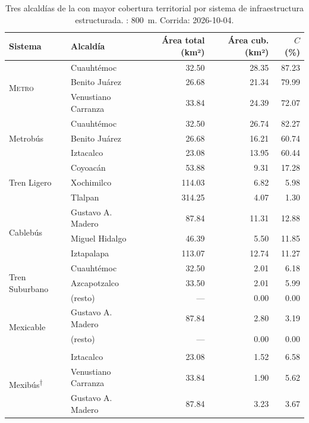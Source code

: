 \begin{table}[H]
    \centering
    \caption[Cobertura territorial — sistemas estructurados, top 3 por alcaldía]{
    Tres alcaldías de la \cdmx{} con mayor cobertura territorial por sistema de
    infraestructura estructurada. : 800~m. Corrida: 2026-10-04.}
    \label{tab:cobertura-estructurados}
    \fontsize{8.5pt}{10.5pt}\selectfont
    \begin{tabularx}{\textwidth}{|l|X|r|r|r|}
        \hline
        \textbf{Sistema} & \textbf{Alcaldía} &
        \textbf{Área total (km²)} & \textbf{Área cub. (km²)} &
        \textbf{$C$ (\%)} \\
        \hline
        \multirow{3}{*}{\textsc{Metro}}
            & Cuauhtémoc          & 32.50 & 28.35 & 87.23 \\
            & Benito Juárez       & 26.68 & 21.34 & 79.99 \\
            & Venustiano Carranza & 33.84 & 24.39 & 72.07 \\
        \hline
        \multirow{3}{*}{Metrobús}
            & Cuauhtémoc    & 32.50 & 26.74 & 82.27 \\
            & Benito Juárez & 26.68 & 16.21 & 60.74 \\
            & Iztacalco     & 23.08 & 13.95 & 60.44 \\
        \hline
        \multirow{3}{*}{Tren Ligero}
            & Coyoacán   &  53.88 &  9.31 & 17.28 \\
            & Xochimilco & 114.03 &  6.82 &  5.98 \\
            & Tlalpan    & 314.25 &  4.07 &  1.30 \\
        \hline
        \multirow{3}{*}{Cablebús}
            & Gustavo A. Madero &  87.84 & 11.31 & 12.88 \\
            & Miguel Hidalgo    &  46.39 &  5.50 & 11.85 \\
            & Iztapalapa        & 113.07 & 12.74 & 11.27 \\
        \hline
        \multirow{3}{*}{Tren Suburbano}
            & Cuauhtémoc   & 32.50 & 2.01 & 6.18 \\
            & Azcapotzalco & 33.50 & 2.01 & 5.99 \\
            & (resto)      &  ---  & 0.00 & 0.00 \\
        \hline
        \multirow{3}{*}{Mexicable}
            & Gustavo A. Madero &  87.84 & 2.80 & 3.19 \\
            & (resto)           &   ---  & 0.00 & 0.00 \\
            &                   &        &      &      \\
        \hline
        \multirow{3}{*}{Mexibús\textsuperscript{†}}
            & Iztacalco           & 23.08 & 1.52 & 6.58 \\
            & Venustiano Carranza & 33.84 & 1.90 & 5.62 \\
            & Gustavo A. Madero   & 87.84 & 3.23 & 3.67 \\
        \hline
    \end{tabularx}
    \vspace{0.4em}


\end{table}
